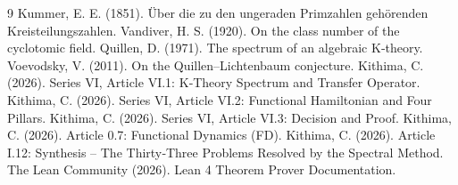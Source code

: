 \documentclass[11pt,a4paper]{article}
\begin{document}

\begin{thebibliography}{9}
  Kummer, E. E. (1851). Über die zu den ungeraden Primzahlen gehörenden Kreisteilungszahlen.
  Vandiver, H. S. (1920). On the class number of the cyclotomic field.
  Quillen, D. (1971). The spectrum of an algebraic K‑theory.
  Voevodsky, V. (2011). On the Quillen–Lichtenbaum conjecture.
  Kithima, C. (2026). Series VI, Article VI.1: K‑Theory Spectrum and Transfer Operator.
  Kithima, C. (2026). Series VI, Article VI.2: Functional Hamiltonian and Four Pillars.
  Kithima, C. (2026). Series VI, Article VI.3: Decision and Proof.
  Kithima, C. (2026). Article 0.7: Functional Dynamics (FD).
  Kithima, C. (2026). Article I.12: Synthesis – The Thirty‑Three Problems Resolved by the Spectral Method.
  The Lean Community (2026). Lean 4 Theorem Prover Documentation.
\end{thebibliography}
\end{document}
